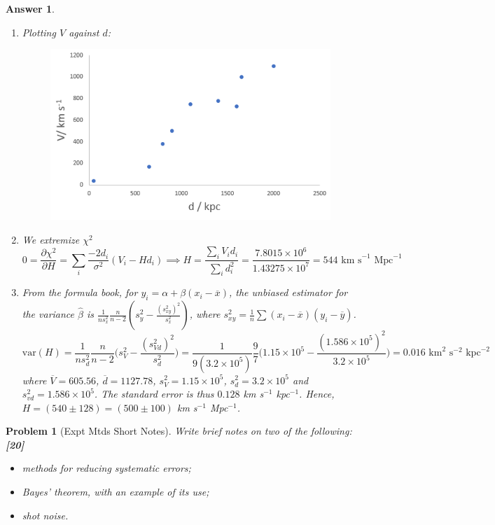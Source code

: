 \documentclass[a4paper]{article}
\newtheorem{ans}{Answer}[subsection]
\theoremstyle{new}
\newtheorem{qns}{Problem}[subsection]
\begin{document}
\begin{ans}\leavevmode
\begin{enumerate}[label=(\roman*)]
\item Plotting $V$ against $d$:
\begin{figure}[H]
    \centering
    \includegraphics[scale=0.6]{2015P1D12.PNG}
\end{figure}
\item We extremize $\chi^2$
$$0=\frac{\partial\chi^2}{\partial H}=\sum_i\frac{-2d_i}{\sigma^2}(V_i-Hd_i)\implies H=\frac{\sum_iV_id_i}{\sum_id_i^2}=\frac{7.8015\times10^6}{1.43275\times10^7}=544\text{ km s}^{-1}\text{ Mpc}^{-1}$$
\item From the formula book, for $y_i=\alpha+\beta(x_i-\overline{x})$, the unbiased estimator for the variance $\hat{\beta}$ is $\frac{1}{ns_x^2}\frac{n}{n-2}(s_y^2-\frac{(s_{xy}^2)^2}{s_x^2})$, where $s_{xy}^2=\frac{1}{n}\sum(x_i-\overline{x})(y_i-\overline{y})$.
$$\text{var}(H)=\frac{1}{ns_d^2}\frac{n}{n-2}\bigg(s_V^2-\frac{(s_{Vd}^2)^2}{s_d^2}\bigg)=\frac{1}{9(3.2\times10^5)}\frac{9}{7}\bigg(1.15\times10^5-\frac{(1.586\times10^5)^2}{3.2\times10^5}\bigg)=0.016\text{ km}^2\text{ s}^{-2}\text{ kpc}^{-2}$$
where $\overline{V}=605.56$, $\overline{d}=1127.78$, $s_V^2=1.15\times10^5$, $s_d^2=3.2\times10^5$ and $s_{vd}^2=1.586\times10^5$. The standard error is thus $0.128$ km s$^{-1}$ kpc$^{-1}$. Hence, $H=(540\pm 128)=(500\pm100)$ km s$^{-1}$ Mpc$^{-1}$.
\end{enumerate}
\end{ans}
\newpage
\begin{qns}[Expt Mtds Short Notes]
Write brief notes on two of the following:\hfill\textbf{[20]}
\begin{itemize}
    \item methods for reducing systematic errors;
    \item Bayes’ theorem, with an example of its use;
    \item shot noise.
\end{itemize}
\end{qns}
\end{document}
